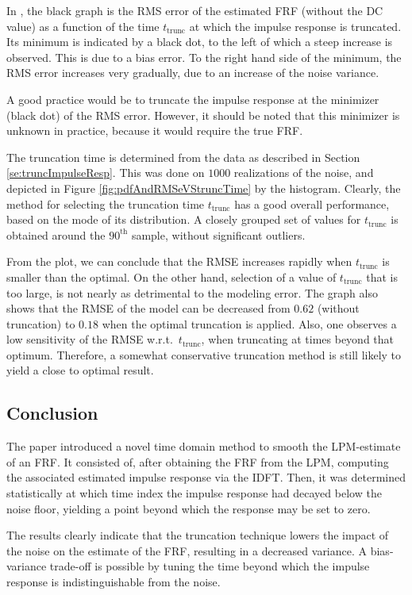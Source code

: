 In , the black graph is the \gls{RMS} error of the estimated \gls{FRF} (without the \gls{DC} value) as a function of the time $t_\mathrm{trunc}$ at which the impulse response is truncated. Its minimum is indicated by a black dot, to the left of which a steep increase is observed. This is due to a bias error. To the right hand side of the minimum, the \gls{RMS} error increases very gradually, due to an increase of the noise variance.

A good practice would be to truncate the impulse response at the minimizer (black dot) of the \gls{RMS} error. However, it should be noted that this minimizer is unknown in practice, because it would require
the true \gls{FRF}.

The truncation time is determined from the data as described in Section \ref{se:truncImpulseResp}. This was done on $1000$ realizations of the noise, and depicted in Figure \ref{fig:pdfAndRMSeVStruncTime} by the histogram.
Clearly, the method for selecting the truncation time $t_{\mathrm{trunc}}$ has a good overall performance, based on the mode of its distribution. A closely grouped set of values for $t_{\mathrm{trunc}}$ is obtained around the $90^{\text{th}}$ sample, without significant outliers.


From the plot, we can conclude that the \gls{RMSE} increases rapidly when $t_{\mathrm{trunc}}$ is smaller than the optimal.
On the other hand, selection of a value of $t_{\mathrm{trunc}}$ that is too large, is not nearly as detrimental to the modeling error.
The graph also shows that the \gls{RMSE} of the model can be decreased from $0.62$ (without truncation) to $0.18$ when the optimal truncation is applied. Also, one observes a low sensitivity of the \gls{RMSE} w.r.t.~$t_\mathrm{trunc}$, when truncating at times beyond that optimum. Therefore, a somewhat conservative truncation method is still likely to yield a close to optimal result.

\subsection{Conclusion}\label{se:conclusion}

The paper introduced a novel time domain method to smooth the \gls{LPM}-estimate of an \gls{FRF}. It consisted of, after obtaining the \gls{FRF} from the \gls{LPM}, computing the associated estimated impulse response via the \gls{IDFT}. 
Then, it was determined statistically at which time index the impulse response had decayed below the noise floor, yielding a point beyond which the response may be set to zero.

The results clearly indicate that the truncation technique lowers the impact of the noise on the estimate of the \gls{FRF}, resulting in a decreased variance. A bias-variance trade-off is possible by tuning the time beyond which the impulse response is indistinguishable from the noise.


% 
% 
% 
